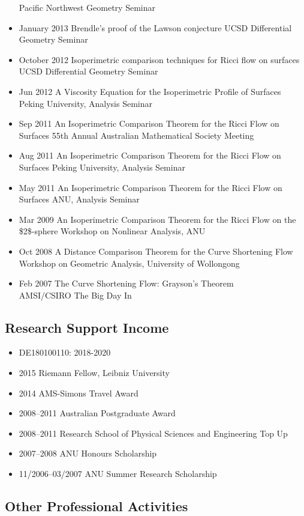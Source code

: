 \documentclass[12pt]{article}
\begin{document}
\begin{itemize}
Pacific Northwest Geometry Seminar
\item January 2013 Brendle's proof of the Lawson conjecture
UCSD Differential Geometry Seminar
\item October 2012 Isoperimetric comparison techniques for Ricci flow on surfaces
UCSD Differential Geometry Seminar
\item Jun 2012 A Viscosity Equation for the Isoperimetric Profile of Surfaces
Peking University, Analysis Seminar
\item Sep 2011 An Isoperimetric Comparison Theorem for the Ricci Flow on Surfaces
55th Annual Australian Mathematical Society Meeting
\item Aug 2011 An Isoperimetric Comparison Theorem for the Ricci Flow on Surfaces
Peking University, Analysis Seminar
\item May 2011  An Isoperimetric Comparison Theorem for the Ricci Flow on Surfaces
ANU, Analysis Seminar
\item Mar 2009  An Isoperimetric Comparison Theorem for the Ricci Flow on the \$2\$-sphere
Workshop on Nonlinear Analysis, ANU
\item Oct 2008 A Distance Comparison Theorem for the Curve Shortening Flow
Workshop on Geometric Analysis, University of Wollongong
\item Feb 2007 The Curve Shortening Flow: Grayson's Theorem\\
AMSI/CSIRO The Big Day In
\end{itemize}

\subsection*{Research Support Income}
\label{sec:orgheadline5}

\begin{itemize}
\item DE180100110: 2018-2020
\item 2015 Riemann Fellow, Leibniz University
\item 2014 AMS-Simons Travel Award
\item 2008--2011 Australian Postgraduate Award
\item 2008--2011 Research School of Physical Sciences and Engineering Top Up
\item 2007--2008 ANU Honours Scholarship
\item 11/2006--03/2007 ANU Summer Research Scholarship
\end{itemize}

\subsection*{Other Professional Activities}
\label{sec:orgheadline6}
\end{document}
